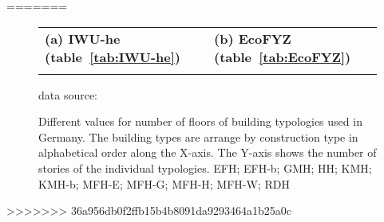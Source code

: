 =======
\begin{figure}[htb]
\centering

\hspace{-2.5cm}
  \begin{tabular}{p{0.5\linewidth} p{0.5\linewidth} }

\textbf{(a) IWU-he (table~\ref{tab:IWU-he})}&
\textbf{(b) EcoFYZ (table~\ref{tab:EcoFYZ})}
\\
\vspace{-2cm}

&
\vspace{-2cm}
\\
  \end{tabular}
\vspace{-1.4cm}

\begin{flushright}
\footnotesize{data source:~\cite{Born.2003,Hermelink.2011}}
\end{flushright}
	\caption[Different values for number of floors of building typologies used in
	Germany.]{Different values for number of floors of building typologies used in
	Germany.
	The building types are arrange by construction type in alphabetical order along
	the X-axis.
	The Y-axis shows the number of stories of the individual typologies.
	EFH; EFH-b; GMH; HH; KMH; KMH-b; MFH-E; MFH-G; MFH-H; MFH-W; RDH}
	\label{fig:DifTypFloor}
\end{figure}
>>>>>>> 36a956db0f2ffb15b4b8091da9293464a1b25a0c
